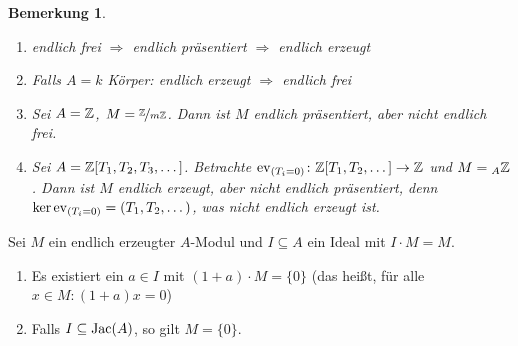 \documentclass[12pt,a4paper]{scrartcl}
\theoremstyle{cplain}
\theoremstyle{cdef}
\newtheorem{beme}[thmcounter]{Bemerkung}
\begin{document}
\begin{beme}\label{bem:2.17}
	\leavevmode
	\begin{enumerate}
		\item endlich frei $\Rightarrow$ endlich präsentiert $\Rightarrow$ endlich erzeugt
		\item Falls $A = k$ Körper: endlich erzeugt $\Rightarrow$ endlich frei
		\item Sei $A = \mathbb Z$, $M = \nicefrac{\mathbb Z}{m\mathbb Z}$. Dann ist $M$ endlich präsentiert, aber nicht endlich frei.
		\item Sei $A = \mathbb Z[T_1,T_2,T_3,\dots]$. Betrachte $\operatorname{ev}_{(T_i = 0)}\colon \mathbb Z[T_1,T_2,\dots]\to \mathbb Z$ und $M = {}_A\mathbb Z$. Dann ist $M$ endlich erzeugt, aber nicht endlich präsentiert, denn $\operatorname{ker}\operatorname{ev}_{(T_i = 0)}= (T_1,T_2,\dots)$, was nicht endlich erzeugt ist.
	\end{enumerate}
\end{beme}
\begin{lem} \label{lem:nakayama}
	Sei $M$ ein endlich erzeugter $A$-Modul und $I\subseteq A$ ein Ideal mit $I \cdot M = M$.
	\begin{enumerate}
		\item \label{lem:nakayama:i} Es existiert ein $a\in I$ mit $(1+a)\cdot M = \{0\}$ \textup(das heißt, für alle $x\in M: (1+a)x = 0$\textup)
		\item Falls $I\subseteq\operatorname{Jac}(A)$, so gilt $M = \{0\}$.
	\end{enumerate}
\end{lem}
\end{document}
